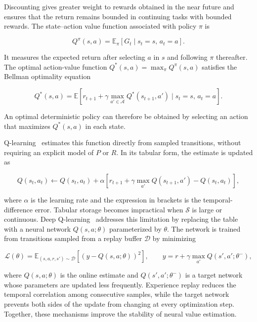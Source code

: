 Discounting gives greater weight to rewards obtained in the near future and
ensures that the return remains bounded in continuing tasks with bounded rewards.
%
The state--action value function associated with policy $\pi$ is

\begin{equation}
  Q^\pi(s,a) = \mathbb{E}_\pi\!\left[G_t
    \mid s_t=s,\,a_t=a\right].
  \label{eq:q-value}
\end{equation}

It measures the expected return after selecting $a$ in $s$ and following $\pi$
thereafter. The optimal action-value function $Q^*(s,a)=\max_\pi Q^\pi(s,a)$
satisfies the Bellman optimality equation

\begin{equation}
  Q^*(s,a) =
  \mathbb{E}\!\left[
    r_{t+1} + \gamma\max_{a'\in\mathcal{A}}Q^*(s_{t+1},a')
    \mid s_t=s,\,a_t=a
  \right].
  \label{eq:bellman}
\end{equation}

An optimal deterministic policy can therefore be obtained by selecting an action
that maximizes $Q^*(s,a)$ in each state.

Q-learning~\cite{watkins1992q} estimates this function directly from sampled transitions, without
requiring an explicit model of $P$ or $R$.
%
In its tabular form, the estimate is updated as

\begin{equation}
  Q(s_t,a_t) \leftarrow Q(s_t,a_t) + \alpha
  \left[
    r_{t+1} + \gamma\max_{a'}Q(s_{t+1},a') - Q(s_t,a_t)
  \right],
  \label{eq:q-learning-update}
\end{equation}

where $\alpha$ is the learning rate and the expression in brackets is the
temporal-difference error.
%
Tabular storage becomes impractical when $\mathcal{S}$ is large or continuous.
Deep Q-learning~\cite{DBLP:journals/nature/MnihKSRVBGRFOPB15} addresses this limitation by replacing the table with a neural
network $Q(s,a;\theta)$ parameterized by $\theta$.
%
The network is trained from transitions sampled from a replay buffer
$\mathcal{D}$ by minimizing

\begin{equation}
  \mathcal{L}(\theta) =
  \mathbb{E}_{(s,a,r,s')\sim\mathcal{D}}
  \left[
    \left(y-Q(s,a;\theta)\right)^2
  \right],
  \qquad
  y = r + \gamma\max_{a'}Q(s',a';\theta^-),
  \label{eq:dql-loss}
\end{equation}

where $Q(s,a;\theta)$ is the online estimate and $Q(s',a';\theta^-)$ is a
target network whose parameters are updated less frequently.
%
Experience replay reduces the temporal correlation among consecutive samples,
while the target network prevents both sides of the update from changing at
every optimization step. Together, these mechanisms improve the stability of
neural value estimation.

